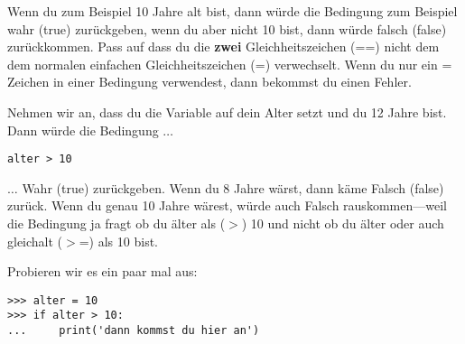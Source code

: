 Wenn du zum Beispiel 10 Jahre alt bist, dann würde die Bedingung  zum Beispiel wahr (true) zurückgeben, wenn du aber nicht 10 bist, dann würde falsch (false) zurückkommen. Pass auf dass du die \textbf{zwei} Gleichheitszeichen (==) nicht dem dem normalen einfachen Gleichheitszeichen (=) verwechselt. Wenn du nur ein = Zeichen in einer Bedingung verwendest, dann bekommst du einen Fehler.
\par
Nehmen wir an, dass du die Variable  auf dein Alter setzt und du 12 Jahre bist. Dann würde die Bedingung $\ldots$

\begin{listing}
\begin{verbatim}
alter > 10
\end{verbatim}
\end{listing}

$\ldots$ Wahr (true) zurückgeben. Wenn du 8 Jahre wärst, dann käme Falsch (false) zurück. Wenn du genau 10 Jahre wärest, würde auch Falsch rauskommen---weil die Bedingung ja fragt ob du älter als ($>$) 10 und nicht ob du älter oder auch gleichalt ($>$=) als 10 bist.

Probieren wir es ein paar mal aus:

\begin{listing}
\begin{verbatim}
>>> alter = 10
>>> if alter > 10:
...     print('dann kommst du hier an')
\end{verbatim}
\end{listing}

